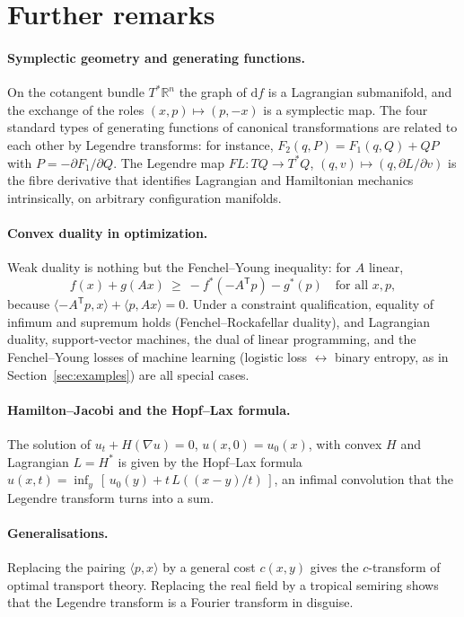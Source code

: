 \documentclass[11pt,a4paper]{article}
\newcommand{\R}{\mathbb{R}}
\newcommand{\dd}{\mathrm{d}}
\newcommand{\ip}[2]{\langle #1,#2\rangle}
\theoremstyle{plain}
\theoremstyle{definition}
\theoremstyle{remark}
\begin{document}
\section{Further remarks}\label{sec:remarks}

\paragraph{Symplectic geometry and generating functions.}
On the cotangent bundle $T^*\R^n$ the graph of $\dd f$ is a Lagrangian
submanifold, and the exchange of the roles $(x,p)\mapsto(p,-x)$ is a
symplectic map.  The four standard types of generating functions of canonical
transformations are related to each other by Legendre transforms: for
instance, $F_2(q,P)=F_1(q,Q)+QP$ with $P=-\partial F_1/\partial Q$.  The
Legendre map $FL\colon TQ\to T^*Q$, $(q,v)\mapsto(q,\partial L/\partial v)$ is
the fibre derivative that identifies Lagrangian and Hamiltonian mechanics
intrinsically, on arbitrary configuration manifolds.

\paragraph{Convex duality in optimization.}
Weak duality is nothing but the Fenchel--Young inequality: for $A$ linear,
\[
  f(x)+g(Ax)\ \ge\ -f^*(-A^{\mathsf T}p)-g^*(p)\quad\text{for all }x,p,
\]
because $\ip{-A^{\mathsf T}p}{x}+\ip{p}{Ax}=0$.  Under a constraint
qualification, equality of infimum and supremum holds (Fenchel--Rockafellar
duality), and Lagrangian duality, support-vector machines, the dual of linear
programming, and the Fenchel--Young losses of machine learning
(logistic loss $\leftrightarrow$ binary entropy, as in Section~\ref{sec:examples})
are all special cases.

\paragraph{Hamilton--Jacobi and the Hopf--Lax formula.}
The solution of $u_t+H(\nabla u)=0$, $u(x,0)=u_0(x)$, with convex
$H$ and Lagrangian $L=H^*$ is given by the Hopf--Lax formula
$u(x,t)=\inf_y\,[\,u_0(y)+t\,L((x-y)/t)\,]$, an infimal convolution that the
Legendre transform turns into a sum.

\paragraph{Generalisations.}
Replacing the pairing $\ip{p}{x}$ by a general cost $c(x,y)$ gives the
$c$-transform of optimal transport theory.  Replacing the real field by a
tropical semiring shows that the Legendre transform is a Fourier transform
in disguise.
\end{document}
